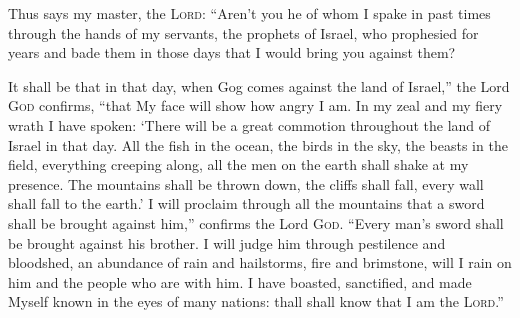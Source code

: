 
\begin{inparaenum}
  
  
  
   Thus says my master, the \textsc{Lord}: ``Aren't you he of whom I spake in past times through the hands of my servants, the prophets of Israel, who prophesied for years and bade them in those days that I would bring you against them?%
  
   It shall be that in that day, when Gog comes against the land of Israel,'' the Lord \textsc{God} confirms, ``that My face will show how angry I am.%
   In my zeal and my fiery wrath I have spoken: `There will be a great commotion throughout the land of Israel in that day.%
   All the fish in the ocean, the birds in the sky, the beasts in the field, everything creeping along, all the men on the earth shall shake at my presence. The mountains shall be thrown down, the cliffs shall fall, every wall shall fall to the earth.'%
   I will proclaim through all the mountains that a sword shall be brought against him,'' confirms the Lord \textsc{God}. ``Every man's sword shall be brought against his brother.%
   I will judge him through pestilence and bloodshed, an abundance of rain and hailstorms, fire and brimstone, will I rain on him and the people who are with him.%
   I have boasted, sanctified, and made Myself known in the eyes of many nations: thall shall know that I am the \textsc{Lord}.''%
\end{inparaenum}
